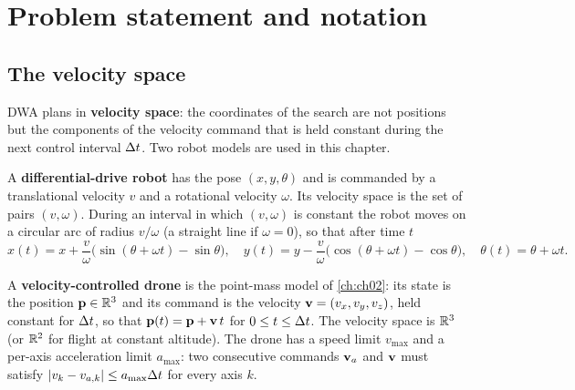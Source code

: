 \section{Problem statement and notation}
\label{sec:ch14-problem}

\subsection{The velocity space}
\label{sec:ch14-velocity-space}

DWA plans in \textbf{velocity space}: the coordinates of
the search are not positions but the components of the velocity command that
is held constant during the next control interval $\Delta t$. Two robot models are
used in this chapter.

\begin{definition}
\label{def:ch14-diffdrive}
A \textbf{differential-drive robot} has the pose
$(x, y, \theta)$ and is commanded by a translational velocity $v$ and a
rotational velocity $\omega$. Its velocity space is the set of pairs
$(v, \omega)$. During an interval in which $(v, \omega)$ is constant the robot
moves on a circular arc of radius $v/\omega$ (a straight line if
$\omega = 0$), so that after time $t$
\begin{equation}
  x(t) = x + \frac{v}{\omega}\bigl(\sin(\theta + \omega t) - \sin\theta\bigr),\quad
  y(t) = y - \frac{v}{\omega}\bigl(\cos(\theta + \omega t) - \cos\theta\bigr),\quad
  \theta(t) = \theta + \omega t.
  \label{eq:ch14-arc}
\end{equation}
\end{definition}

\begin{definition}
\label{def:ch14-drone}
A \textbf{velocity-controlled drone} is the
point-mass model of \cref{ch:ch02}: its state is the position $\mathbf{p} \in \mathbb{R}^3$
and its command is the velocity $\mathbf{v} = (v_x, v_y, v_z)$, held constant for
$\Delta t$, so that $\mathbf{p}(t) = \mathbf{p} + \mathbf{v}\,t$ for $0 \le t \le \Delta t$. The velocity
space is $\mathbb{R}^3$ (or $\mathbb{R}^2$ for flight at constant altitude). The drone has a
speed limit $v_{\max}$ and a per-axis acceleration limit $a_{\max}$: two
consecutive commands $\mathbf{v}_a$ and $\mathbf{v}$ must satisfy
$\left\lvert v_k - v_{a,k} \right\rvert \le a_{\max}\Delta t$ for every axis $k$.
\end{definition}

